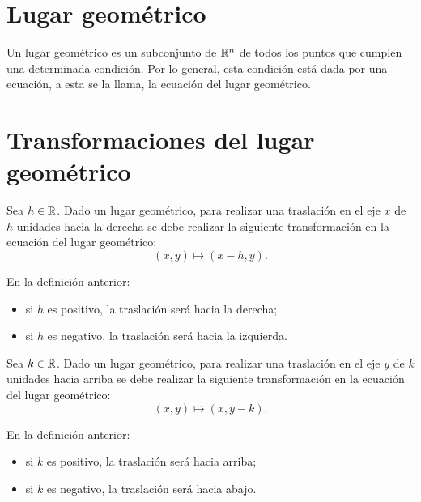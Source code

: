 \documentclass[a4,11pt]{aleph-notas}
\begin{document}
\encabezado

\section{Lugar geométrico}

\begin{defi}
    Un lugar geométrico es un subconjunto de $\mathbb{R}^n$ de todos los puntos que cumplen una determinada condición. Por lo general, esta condición está dada por una ecuación, a esta se la llama, la ecuación del lugar geométrico.
\end{defi}


\section{Transformaciones del lugar geométrico}


\begin{defi}
    Sea $h\in\mathbb{R}$. Dado un lugar geométrico, para realizar una traslación en el eje $x$ de $h$ unidades hacia la derecha se debe realizar la siguiente transformación en la ecuación del lugar geométrico:
    \[
        (x,y)\mapsto (x-h,y).
    \]
\end{defi}

\begin{advertencia}
    En la definición anterior:
    \begin{itemize}
        \item si $h$ es positivo, la traslación será hacia la derecha;
        \item si $h$ es negativo, la traslación será hacia la izquierda.
    \end{itemize}
\end{advertencia}

\begin{defi}
    Sea $k\in\mathbb{R}$. Dado un lugar geométrico, para realizar una traslación en el eje $y$ de $k$ unidades hacia arriba se debe realizar la siguiente transformación en la ecuación del lugar geométrico:
    \[
        (x,y)\mapsto (x,y-k).
    \]
\end{defi}

\begin{advertencia}
    En la definición anterior:
    \begin{itemize}
        \item si $k$ es positivo, la traslación será hacia arriba;
        \item si $k$ es negativo, la traslación será hacia abajo.
    \end{itemize}
\end{advertencia}
\end{document}
